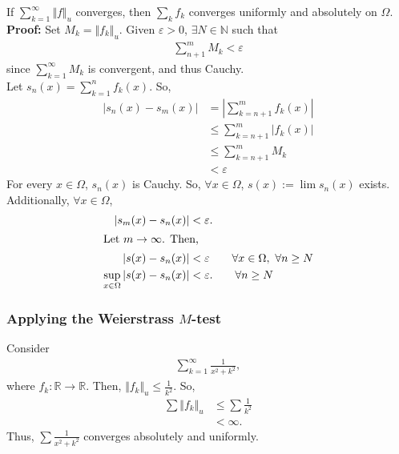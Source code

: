 \documentclass[10pt]{extarticle}
\newcommand{\N}{\mathbb{N}}
\newcommand{\R}{\mathbb{R}}
\begin{document}
    If $\sum_{k=1}^{\infty}\Vert f\Vert_u$ converges, then $\sum_{k} f_k$ converges uniformly and absolutely on $\Omega$.\\

    \textbf{Proof:} Set $M_k = \Vert f_k \Vert_u$. Given $\varepsilon > 0$, $\exists N \in \N$ such that
    \begin{align*}
      \sum_{n+1}^{m} M_k < \varepsilon \tag*{$\forall m > n \geq N$}
    \end{align*}
    since $\sum_{k=1}^{\infty}M_k$ is convergent, and thus Cauchy.\\

    Let $s_n(x) = \sum_{k=1}^{n} f_k(x)$. So,
    \begin{align*}
      |s_n(x) - s_m(x)| &= \left|\sum_{k=n+1}^{m}f_k(x)\right|\\
                        &\leq \sum_{k=n+1}^{m}|f_k(x)|\\
                        &\leq \sum_{k=n+1}^{m}M_k \\
                        &< \varepsilon \tag*{whenever $m > n \geq N$}
    \end{align*}
    For every $x\in\Omega$, $s_n(x)$ is Cauchy. So, $\forall x\in\Omega$, $s(x) := \lim s_n(x)$ exists.\\

    Additionally, $\forall x\in\Omega$,
    \begin{align*}
      |s_m(x) - s_n(x)| &< \varepsilon. \\
      \shortintertext{Let $m\rightarrow\infty$. Then,}
      |s(x) - s_n(x)| &< \varepsilon \tag*{$\forall x\in\Omega,~\forall n\geq N$}\\
      \sup_{x\in\Omega}|s(x) - s_n(x)| &< \varepsilon. \tag*{$\forall n \geq N$}
    \end{align*}
    \subsubsection{Applying the Weierstrass $M$-test}%
    Consider
    \begin{align*}
      \sum_{k=1}^{\infty}\frac{1}{x^2 + k^2},
    \end{align*}
    where $f_k: \R \rightarrow \R$. Then, $\Vert f_k \Vert_u \leq \frac{1}{k^2}$. So,
    \begin{align*}
      \sum \Vert f_k \Vert_u &\leq \sum \frac{1}{k^2}\\
                             &< \infty.
    \end{align*}
    Thus, $\sum \frac{1}{x^2 + k^2}$ converges absolutely and uniformly.
\end{document}
